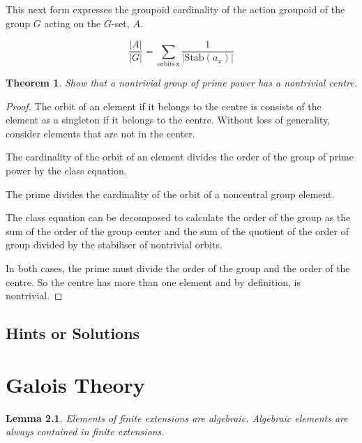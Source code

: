 \documentclass{tufte-book}
\newtheorem{theorem}{Theorem}
\newtheorem{lemma}[theorem]{Lemma}
\begin{document}
This next form expresses the groupoid cardinality of the action groupoid of the group $G$ acting on the $G$-set, $A$.

\begin{equation}
  \dfrac{|A|}{|G|} = \sum_{\mathrm{orbits \, x}}
  \dfrac{1}{|\mathrm{Stab}(a_x)|}
\end{equation}

\begin{theorem}
  Show that a nontrivial group of prime power has a nontrivial centre.
\end{theorem}

\begin{proof}
  The orbit of an element if it belongs to the centre is consists of the element as a singleton if it belongs to the centre. Without loss of generality, consider elements that are not in the center.

  The cardinality of the orbit of an element divides the order of the group of prime power by the class equation. 
  
  The prime divides the cardinality of the orbit of a noncentral group element. 
  
  The class equation can be decomposed to calculate the order of the group as the sum of the order of the group center and the sum of the quotient of the order of group divided by the stabiliser of nontrivial orbits. 
  
  In both cases, the prime must divide the order of the group and the order of the centre. So the centre has more than one element and by definition, is nontrivial.
\end{proof}

\section{Hints or Solutions}

\chapter{Galois Theory}

\begin{lemma}
    Elements of finite extensions are algebraic. Algebraic elements are always contained in finite extensions.
\end{lemma}
\end{document}
